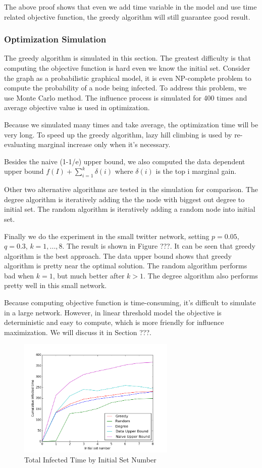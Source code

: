 \documentclass{article}
\begin{document}
The above proof shows that even we add time variable in the model and use time related objective function, the greedy algorithm will still guarantee good result.

\subsubsection{Optimization Simulation}
The greedy algorithm is simulated in this section. The greatest difficulty is that computing the objective function is hard even we know the initial set. Consider the graph as a probabilistic graphical model, it is even NP-complete problem to compute the probability of a node being infected. To address this problem, we use Monte Carlo method. The influence process is simulated for 400 times and average objective value is used in optimization. 

Because we simulated many times and take average, the optimization time will be very long. To speed up the greedy algorithm, lazy hill climbing is used by re-evaluating marginal increase only when it's necessary. 

Besides the naive (1-1/e) upper bound, we also computed the data dependent upper bound $f(I)+\sum_{i=1}^k \delta(i)$ where $\delta(i)$ is the top i marginal gain.

Other two alternative algorithms are tested in the simulation for comparison. The degree algorithm is iteratively adding the the node with biggest out degree to initial set. The random algorithm is iteratively adding a random node into initial set.

Finally we do the experiment in the small twitter network, setting $p=0.05$, $q=0.3$, $k=1,...,8$. The result is shown in Figure ???. It can be seen that greedy algorithm is the best approach. The data upper bound shows that greedy algorithm is pretty near the optimal solution. The random algorithm performs bad when $k=1$, but much better after $k>1$. The degree algorithm also performs pretty well in this small network. 

Because computing objective function is time-consuming, it's difficult to simulate in a large network. However, in linear threshold model the objective is deterministic and easy to compute, which is more friendly for influence maximization. We will discuss it in Section ???.

\begin{figure}[H]
\centering
\includegraphics[width=7.5cm]{influence_max.png}
\caption{Total Infected Time by Initial Set Number}
\end{figure}
\end{document}
